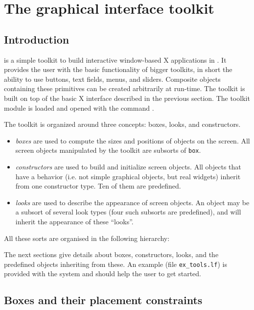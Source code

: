 
\section{The graphical interface toolkit}
\label{xtools}

\subsection{Introduction}

 is a simple toolkit to build interactive window-based X applications
in \WLIFE. It provides the
user with the basic functionality of bigger toolkits,
in short the ability to use buttons, text fields, menus,
and sliders. 
Composite objects containing these primitives can be created
arbitrarily at run-time. The toolkit is built on top of the 
basic X interface described in the previous section.
The toolkit module is loaded and opened with the command
.

The toolkit is organized around three concepts: boxes, looks, and constructors.
  \begin{itemize}
  \item {\it boxes} are used to compute the sizes and positions of
     objects on the screen.
     All screen objects manipulated by the toolkit are subsorts of {\tt box}. 
  \item {\it constructors} are used to build and initialize screen objects. All
    objects that have a behavior (i.e. not simple graphical objects,
    but real widgets) inherit from one constructor type. Ten of them are
    predefined.  
  \item {\it looks} are used to describe the appearance of screen objects.
    An object may be a subsort of several look types (four such subsorts are
    predefined), and will inherit the appearance of these ``looks''.  
  \end{itemize}

All these sorts are organised in the following hierarchy:

\centerline{} 

The next sections give details about boxes, constructors, looks, and the
predefined objects inheriting from these. An example (file \verb+ex_tools.lf+)
is provided with the system and should help the user to get started.

\subsection{Boxes and their placement constraints}

